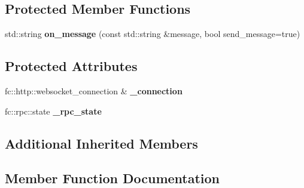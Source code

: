 \subsection*{Protected Member Functions}
\begin{DoxyCompactItemize}
\item 
\mbox{\label{classfc_1_1rpc_1_1websocket__api__connection_a1fce181c4cd79f53a796311293201518}} 
std\+::string {\bfseries on\+\_\+message} (const std\+::string \&message, bool send\+\_\+message=true)
\end{DoxyCompactItemize}
\subsection*{Protected Attributes}
\begin{DoxyCompactItemize}
\item 
\mbox{\label{classfc_1_1rpc_1_1websocket__api__connection_a5d37db5ef4fe802d87e4f6ee99c2798a}} 
fc\+::http\+::websocket\+\_\+connection \& {\bfseries \+\_\+connection}
\item 
\mbox{\label{classfc_1_1rpc_1_1websocket__api__connection_a05bbf1dfec628036d64033dd230af9b5}} 
fc\+::rpc\+::state {\bfseries \+\_\+rpc\+\_\+state}
\end{DoxyCompactItemize}
\subsection*{Additional Inherited Members}


\subsection{Member Function Documentation}
\mbox{\label{classfc_1_1rpc_1_1websocket__api__connection_a30eb8e7cdee7c2ca0049f565f100ab14}} 
